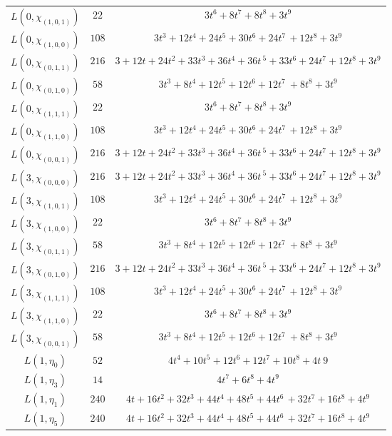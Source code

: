 \begin{center}
\begin{tabular}{c|c|c}
$L(0,\chi_{(1,0,1)})$ & $22$ & $3t^{6} + 8t^{7} + 8t^{8} + 3t^{9}$ \\
$L(0,\chi_{(1,0,0)})$ & $108$ & $3t^{3} + 12t^{4} + 24t^{5} + 30t^{6} + 24t^{7\
} + 12t^{8} + 3t^{9}$ \\
$L(0,\chi_{(0,1,1)})$ & $216$ & $3 + 12t + 24t^{2} + 33t^{3} + 36t^{4} + 36t^{\
5} + 33t^{6} + 24t^{7} + 12t^{8} + 3t^{9}$ \\
$L(0,\chi_{(0,1,0)})$ & $58$ & $3t^{3} + 8t^{4} + 12t^{5} + 12t^{6} + 12t^{7} \
+ 8t^{8} + 3t^{9}$ \\
$L(0,\chi_{(1,1,1)})$ & $22$ & $3t^{6} + 8t^{7} + 8t^{8} + 3t^{9}$ \\
$L(0,\chi_{(1,1,0)})$ & $108$ & $3t^{3} + 12t^{4} + 24t^{5} + 30t^{6} + 24t^{7\
} + 12t^{8} + 3t^{9}$ \\
$L(0,\chi_{(0,0,1)})$ & $216$ & $3 + 12t + 24t^{2} + 33t^{3} + 36t^{4} + 36t^{\
5} + 33t^{6} + 24t^{7} + 12t^{8} + 3t^{9}$ \\
$L(3,\chi_{(0,0,0)})$ & $216$ & $3 + 12t + 24t^{2} + 33t^{3} + 36t^{4} + 36t^{\
5} + 33t^{6} + 24t^{7} + 12t^{8} + 3t^{9}$ \\
$L(3,\chi_{(1,0,1)})$ & $108$ & $3t^{3} + 12t^{4} + 24t^{5} + 30t^{6} + 24t^{7\
} + 12t^{8} + 3t^{9}$ \\
$L(3,\chi_{(1,0,0)})$ & $22$ & $3t^{6} + 8t^{7} + 8t^{8} + 3t^{9}$ \\
$L(3,\chi_{(0,1,1)})$ & $58$ & $3t^{3} + 8t^{4} + 12t^{5} + 12t^{6} + 12t^{7} \
+ 8t^{8} + 3t^{9}$ \\
$L(3,\chi_{(0,1,0)})$ & $216$ & $3 + 12t + 24t^{2} + 33t^{3} + 36t^{4} + 36t^{\
5} + 33t^{6} + 24t^{7} + 12t^{8} + 3t^{9}$ \\
$L(3,\chi_{(1,1,1)})$ & $108$ & $3t^{3} + 12t^{4} + 24t^{5} + 30t^{6} + 24t^{7\
} + 12t^{8} + 3t^{9}$ \\
$L(3,\chi_{(1,1,0)})$ & $22$ & $3t^{6} + 8t^{7} + 8t^{8} + 3t^{9}$ \\
$L(3,\chi_{(0,0,1)})$ & $58$ & $3t^{3} + 8t^{4} + 12t^{5} + 12t^{6} + 12t^{7} \
+ 8t^{8} + 3t^{9}$ \\
$L(1,\eta_{0})$ & $52$ & $4t^{4} + 10t^{5} + 12t^{6} + 12t^{7} + 10t^{8} + 4t^\
{9}$ \\
$L(1,\eta_{3})$ & $14$ & $4t^{7} + 6t^{8} + 4t^{9}$ \\
$L(1,\eta_{1})$ & $240$ & $4t + 16t^{2} + 32t^{3} + 44t^{4} + 48t^{5} + 44t^{6\
} + 32t^{7} + 16t^{8} + 4t^{9}$ \\
$L(1,\eta_{5})$ & $240$ & $4t + 16t^{2} + 32t^{3} + 44t^{4} + 48t^{5} + 44t^{6\
} + 32t^{7} + 16t^{8} + 4t^{9}$ \\

\end{tabular}
\end{center}
